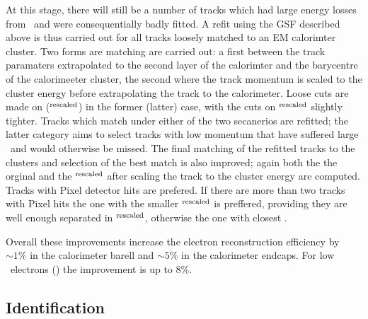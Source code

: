 At this stage, there will still be a number of tracks which had large energy
losses from \brem\ and were consequentially badly fitted. A refit using the GSF
described above is thus carried out for all tracks loosely matched to an
EM calorimter cluster. Two forms are matching are carried out: a first between the
track paramaters extrapolated to the second layer of the calorimter and the
barycentre of the calorimeeter cluster, the second where the track momentum is
scaled to the cluster energy before extrapolating the track to the calorimeter.
Loose cuts are made on \deltaR (\deltaR$^{\rm{rescaled}}$) in the former
(latter) case, with the cuts on \deltaR$^{\rm{rescaled}}$ slightly tighter.
Tracks which match under either of the two secanerios are refitted; the latter
category aims to select tracks with low momentum that have suffered large
\brem\ and would otherwise be missed. The final matching of the refitted tracks
to the clusters and selection of the best match is also improved; again both the
the orginal \deltaR and the \deltaR$^{\rm{rescaled}}$ after scaling the track to the cluster
energy are computed. Tracks with Pixel detector hits are prefered. If there are
more than two tracks with Pixel hits the one with the smaller
\deltaR$^{\rm{rescaled}}$ is preffered, providing they are well enough
separated in \deltaR$^{\rm{rescaled}}$, otherwise the one with closest \deltaR.

Overall these improvements increase the electron reconstruction efficiency by
$\sim 1\%$ in the calorimeter barell and $\sim 5\%$ in the calorimeter endcaps.
For low \et\ electrons () the improvement is up to 8\%.

\subsection{Identification}
\label{sec:reco-el-id}

